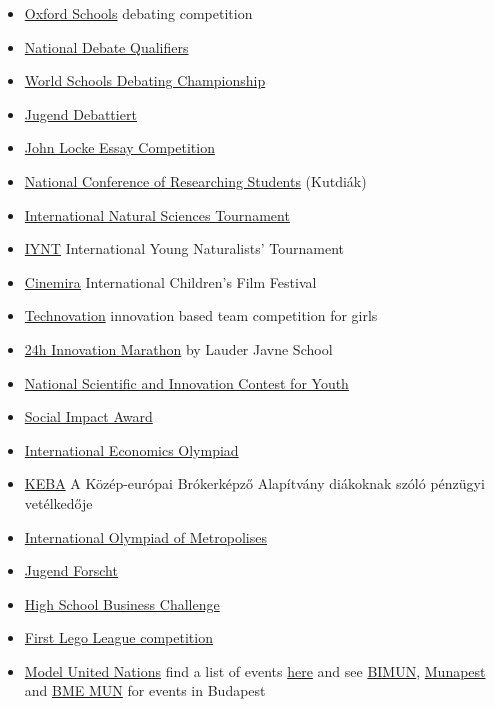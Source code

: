 \documentclass{article}
\begin{document}
\begin{itemize}
    \item \href{https://www.oxfordschools.net/}{Oxford Schools} debating competition
    \item \href{https://milestone-institute.org/student-life/debate/}{National Debate Qualifiers}
    \item \href{https://wsdcdebate.org/about-wsdc}{World Schools Debating Championship}
    \item \href{https://www.jugend-debattiert.eu/}{Jugend Debattiert}
    \item \href{https://www.johnlockeinstitute.com/essay-competition}{John Locke Essay Competition}
    \item \href{https://www.kutdiak.hu/en/events/}{National Conference of Researching Students} (Kutdiák)
    \item \href{https://scitourn.com/}{International Natural Sciences Tournament}
    \item \href{http://iynt.org/}{IYNT} International Young Naturalists' Tournament
    \item \href{https://www.kidfilmfestival.hu/en/}{Cinemira} International Children's Film Festival
    \item \href{https://technovationchallenge.org/}{Technovation} innovation based team competition for girls
    \item \href{https://lim.lauder.hu/}{24h Innovation Marathon} by Lauder Javne School
    \item \href{https://www.innovacio.hu/en_3a.htm}{National Scientific and Innovation Contest for Youth}
    \item \href{https://hungary.socialimpactaward.net/en/}{Social Impact Award}
    \item \href{https://ecolymp.org/}{International Economics Olympiad}
    \item \href{https://kebaverseny.hu/}{KEBA} A Közép-európai Brókerképző Alapítvány diákoknak szóló pénzügyi vetélkedője
    \item \href{http://megapolis.educom.ru/en}{International Olympiad of Metropolises}
    \item \href{https://www.jugend-forscht.de/}{Jugend Forscht}
    \item \href{https://businessismore.eu/}{High School Business Challenge}
    \item \href{https://www.firstlegoleague.org/}{First Lego League competition}
    \item \href{https://en.wikipedia.org/wiki/Model_United_Nations}{Model United Nations} find a list of events \href{https://mymun.com/}{here} and see \href{https://www.bimun.hu/}{BIMUN}, \href{http://munapest.com/}{Munapest} and \href{https://www.mun.bme.hu/}{BME MUN} for events in Budapest

\end{itemize}
\end{document}
